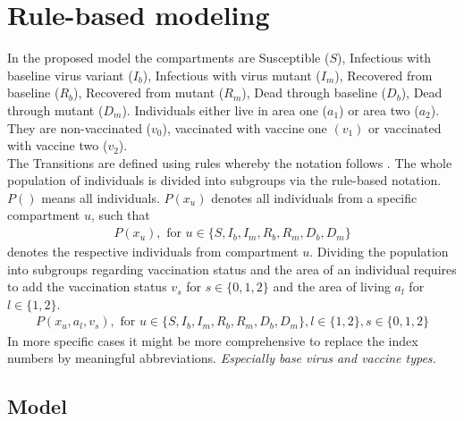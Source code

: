 \section{Rule-based modeling}

In the proposed model the compartments are Susceptible ($S$), Infectious with baseline virus variant ($I_b$), Infectious with virus mutant ($I_m$), Recovered from baseline ($R_b$), Recovered from mutant ($R_m$), Dead through baseline ($D_b$), Dead through mutant ($D_m$). Individuals either live in area one ($a_1$) or area two ($a_2$). They are non-vaccinated ($v_0$), vaccinated with vaccine one $(v_1)$ or vaccinated with vaccine two ($v_2$). \\ 

The Transitions are defined using rules whereby the notation follows \cite{Waites.2021}. The whole population of individuals is divided into subgroups via the rule-based notation. $P()$ means all individuals. $P(x_u)$ denotes all individuals from a specific compartment $u$, such that 
\begin{align}
    P(x_u), \text{ for } u \in \{S, I_b, I_m, R_b, R_m, D_b, D_m \}
\end{align}
denotes the respective individuals from compartment $u$.
Dividing the population into subgroups regarding vaccination status and the area of an individual requires to add the vaccination status $v_s$ for $s \in \{0,1,2 \}$ and the area of living $a_l$ for $l \in \{1,2\}$.
\begin{align}
    P(x_u, a_l, v_s), \text{ for } u \in \{S, I_b, I_m, R_b, R_m, D_b, D_m \}, l \in \{1,2\}, s \in \{0,1,2 \} 
\end{align}
In more specific cases it might be more comprehensive to replace the index numbers by meaningful abbreviations. \textit{Especially base virus and vaccine types.}

\subsection{Model}


